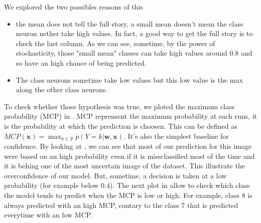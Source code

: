 We explored the two possibles reasons of this
\begin{itemize}
    \item the mean does not tell the full story, a small mean doesn't mean the class neuron nether take high values. In fact, a good way to get the full story is to check the last column. As we can see, sometime, by the power of stochasticity, those "small mean" classes can take high values around $0.8$ and so have an high chance of being predicted. 
    \item The class neurons sometime take low values but this low value is the max along the other class neurons. 
\end{itemize}
To check whether those hypothesis was true, we ploted the maximum class probability (MCP) in . MCP reprensent the maximum probability at each runs, it is the probability at which the prediction is choosen. This can be defined as $ MCP(\boldsymbol{x}) = \max _{k \in \mathcal{Y}} p(Y=k | \boldsymbol{w}, \boldsymbol{x}) $. It's also the simplest baseline for confidence. By looking at , we can see that most of our prediction for this image were based on an high probability even if it is missclassified most of the time and it is behing one of the most uncertain image of the dataset. This illustrate the overconfidence of our model. But, sometime, a decision is taken at a low probability (for example below $ 0.4 $). The next plot in  allow to check which class the model tends to predict when the MCP is low or high. For example, class 8 is always predicted with an high MCP, contary to the class 7 that is predicted everytime with an low MCP.

